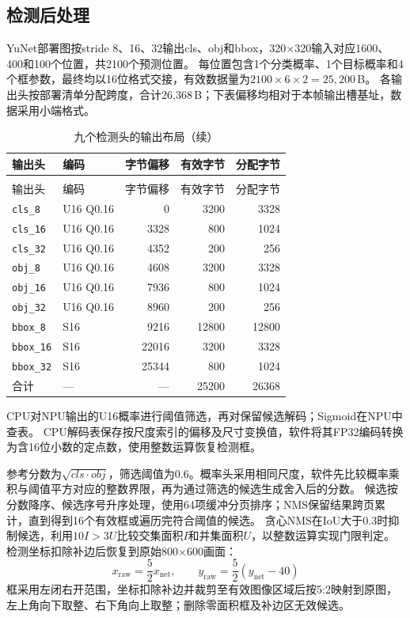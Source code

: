 \subsection{检测后处理}

YuNet部署图按stride 8、16、32输出cls、obj和bbox，320$\times$320输入对应1600、400和100个位置，共2100个预测位置。
每位置包含1个分类概率、1个目标概率和4个框参数，最终均以16位格式交接，有效数据量为$2100\times6\times2=25,200$\,B。
各输出头按部署清单分配跨度，合计26,368\,B；下表偏移均相对于本帧输出槽基址，数据采用小端格式。

\begin{reporttable}
\setlength{\tabcolsep}{5pt}
\begin{longtable}{@{}llrrr@{}}
\caption{九个检测头的输出布局}\\
\toprule
输出头 & 编码 & 字节偏移 & 有效字节 & 分配字节 \\
\midrule
\endfirsthead
\caption[]{九个检测头的输出布局（续）}\\
\toprule
输出头 & 编码 & 字节偏移 & 有效字节 & 分配字节 \\
\midrule
\endhead
\bottomrule
\endfoot
\texttt{cls\_8} & U16 Q0.16 & 0 & 3200 & 3328 \\
\texttt{cls\_16} & U16 Q0.16 & 3328 & 800 & 1024 \\
\texttt{cls\_32} & U16 Q0.16 & 4352 & 200 & 256 \\
\texttt{obj\_8} & U16 Q0.16 & 4608 & 3200 & 3328 \\
\texttt{obj\_16} & U16 Q0.16 & 7936 & 800 & 1024 \\
\texttt{obj\_32} & U16 Q0.16 & 8960 & 200 & 256 \\
\texttt{bbox\_8} & S16 & 9216 & 12800 & 12800 \\
\texttt{bbox\_16} & S16 & 22016 & 3200 & 3328 \\
\texttt{bbox\_32} & S16 & 25344 & 800 & 1024 \\
合计 & --- & --- & 25200 & 26368 \\
\end{longtable}
\end{reporttable}

CPU对NPU输出的U16概率进行阈值筛选，再对保留候选解码；Sigmoid在NPU中查表。
CPU解码表保存按尺度索引的偏移及尺寸变换值，软件将其FP32编码转换为含16位小数的定点数，使用整数运算恢复检测框。

参考分数为$\sqrt{cls\cdot obj}$，筛选阈值为0.6。概率头采用相同尺度，软件先比较概率乘积与阈值平方对应的整数界限，再为通过筛选的候选生成舍入后的分数。
候选按分数降序、候选序号升序处理，使用64项缓冲分页排序；NMS保留结果跨页累计，直到得到16个有效框或遍历完符合阈值的候选。
贪心NMS在IoU大于0.3时抑制候选，利用$10I>3U$比较交集面积$I$和并集面积$U$，以整数运算实现门限判定。
检测坐标扣除补边后恢复到原始800$\times$600画面：
\[
x_{\mathrm{raw}}=\frac{5}{2}x_{\mathrm{net}},\qquad
y_{\mathrm{raw}}=\frac{5}{2}(y_{\mathrm{net}}-40)
\]
框采用左闭右开范围，坐标扣除补边并裁剪至有效图像区域后按5:2映射到原图，左上角向下取整、右下角向上取整；删除零面积框及补边区无效候选。


